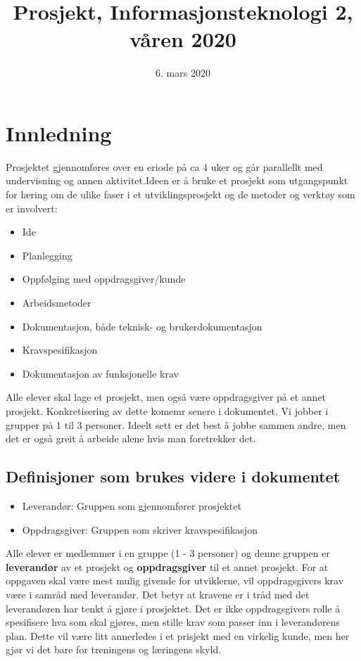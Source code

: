 \documentclass[11pt]{article} %
\title{Prosjekt, Informasjonsteknologi 2, våren 2020}
\date{6. mars 2020} %
\begin{document}
\maketitle
{}

\section{Innledning}
    Prosjektet gjennomføres over en eriode på ca 4 uker og går parallellt med undervisning og annen aktivitet.Ideen er å bruke et prosjekt som utgangspunkt for læring om de ulike faser i et utviklingsprosjekt og de metoder og verktøy som er involvert:
    \begin{itemize}
        \item Ide
        \item Planlegging
        \item Oppfølging med oppdragsgiver/kunde
        \item Arbeidsmetoder
        \item Dokumentasjon, både teknisk- og brukerdokumentasjon
        \item Kravspesifikasjon
        \item Dokumentasjon av funksjonelle krav
    \end{itemize}
    Alle elever skal lage et prosjekt, men også være oppdragsgiver på et annet prosjekt. Konkretisering av dette komemr senere i dokumentet. Vi jobber i grupper på 1 til 3 personer. Ideelt sett er det best å jobbe sammen andre, men det er også greit å arbeide alene hvis man foretrekker det.
    \subsection{Definisjoner som brukes videre i dokumentet}
        \begin{itemize}
            \item Leverandør: Gruppen som gjennomfører prosjektet
            \item Oppdragsgiver: Gruppen som skriver kravspesifikasjon
        \end{itemize}
        Alle elever er medlemmer i en gruppe (1 - 3 personer) og denne gruppen er \textbf{leverandør} av et prosjekt og \textbf{oppdragsgiver} til et annet prosjekt. For at oppgaven skal være mest  mulig givende for utviklerne, vil oppdragsgivers krav være i samråd med leverandør. Det betyr at kravene er i tråd med det leverandøren har tenkt å gjøre i prosjektet. Det er ikke oppdragsgivers rolle å spesifisere hva som skal gjøres, men stille krav som passer inn i leverandørens plan. Dette vil være litt annerledes i et prisjekt med en virkelig kunde, men her gjør vi det bare for treningens og læringens skyld.
\end{document}
